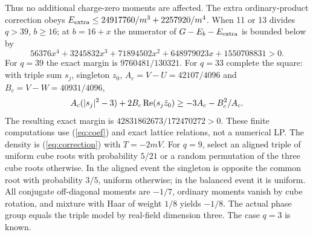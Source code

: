 \documentclass[11pt]{article}
\begin{document}
Thus no additional charge-zero moments are affected. The extra ordinary-product correction obeys $E_{\rm extra}\le24917760/m^3+2257920/m^4$. When 11 or 13 divides $q>39$, $b\ge16$; at $b=16+x$ the numerator of $G-E_b-E_{\rm extra}$ is bounded below by
\[56376x^4+3245832x^3+71894502x^2+648979023x+1550708831>0.\]
For $q=39$ the exact margin is $9760481/130321$. For $q=33$ complete the square: with triple sum $s_j$, singleton $z_0$, $A_c=V-U=42107/4096$ and $B_c=V-W=40931/4096$,
\[A_c(|s_j|^2-3)+2B_c\operatorname{Re}(s_j\bar z_0)\ge-3A_c-B_c^2/A_c.\]
The resulting exact margin is $42831862673/172470272>0$. These finite computations use (\ref{eq:coef}) and exact lattice relations, not a numerical LP. The density is (\ref{eq:correction}) with $T=-2mV$. For $q=9$, select an aligned triple of uniform cube roots with probability $5/21$ or a random permutation of the three cube roots otherwise. In the aligned event the singleton is opposite the common root with probability $3/5$, uniform otherwise; in the balanced event it is uniform. All conjugate off-diagonal moments are $-1/7$, ordinary moments vanish by cube rotation, and mixture with Haar of weight $1/8$ yields $-1/8$. The actual phase group equals the triple model by real-field dimension three. The case $q=3$ is known.
\end{document}
